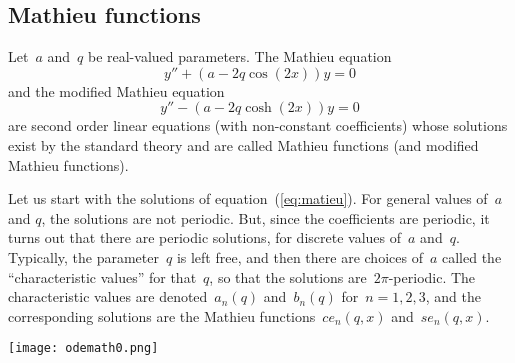\subsection{Mathieu functions}

Let~$a$ and~$q$ be real-valued parameters.
The Mathieu equation
\begin{equation}\label{eq:mathieu}
	y'' + (a-2q\cos(2x))y = 0
\end{equation}
and the modified Mathieu equation
\begin{equation}\label{eq:mathieumod}
	y'' - (a-2q\cosh(2x))y = 0
\end{equation}
are second order linear equations (with non-constant coefficients)
whose solutions exist by the standard theory and are called Mathieu
functions (and modified Mathieu functions).

Let us start with the solutions of equation~(\ref{eq:matieu}).  For
general values of~$a$ and $q$, the solutions are not periodic.  But,
since the coefficients are periodic, it turns out that there are
periodic solutions, for discrete values of~$a$ and~$q$.  Typically,
the parameter~$q$ is left free, and then there are choices
of~$a$ called the ``characteristic values'' for that~$q$, so that the
solutions are~$2\pi$-periodic.  The characteristic values are
denoted~$a_n(q)$ and~$b_n(q)$ for~$n=1,2,3$, and the corresponding
solutions are the Mathieu functions~$ce_n(q,x)$ and~$se_n(q,x)$.

\texttt{[image: odemath0.png]}






